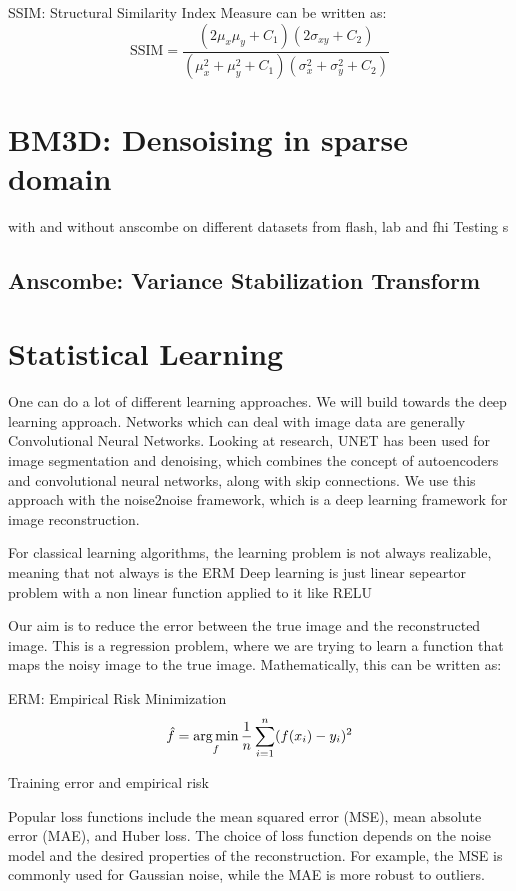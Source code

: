 SSIM: Structural Similarity Index Measure can be written as:
\begin{equation}
    \text{SSIM} = \frac{(2\mu_x\mu_y + C_1)(2\sigma_{xy} + C_2)}{(\mu_x^2 + \mu_y^2 + C_1)(\sigma_x^2 + \sigma_y^2 + C_2)}
\end{equation}

\section{BM3D: Densoising in sparse domain}
with and without anscombe on different datasets from flash, lab and fhi
Testing s
\subsection{Anscombe: Variance Stabilization Transform}

\section{Statistical Learning}
One can do a lot of different learning approaches. We will build towards the deep learning approach. Networks which can deal with image data are generally Convolutional Neural Networks. Looking at research, UNET has been used for image segmentation and denoising, which combines the concept of autoencoders and convolutional neural networks, along with skip connections.
We use this approach with the noise2noise framework, which is a deep learning framework for image reconstruction.

For classical learning algorithms, the learning problem is not always realizable, meaning that not always is the 
ERM 
Deep learning is just linear sepeartor problem with a non linear function applied to it like RELU

Our aim is to reduce the error between the true image and the reconstructed image. This is a regression problem, where we are trying to learn a function that maps the noisy image to the true image. Mathematically, this can be written as:

ERM: Empirical Risk Minimization
\begin{equation}
    \hat{f} = \operatorname*{arg\,min}_f \frac{1}{n} \sum_{i=1}^{n} (f(x_i) - y_i)^{2}
\end{equation}

Training error and empirical risk 

Popular loss functions include the mean squared error (MSE), mean absolute error (MAE), and Huber loss. The choice of loss function depends on the noise model and the desired properties of the reconstruction. For example, the MSE is commonly used for Gaussian noise, while the MAE is more robust to outliers.

